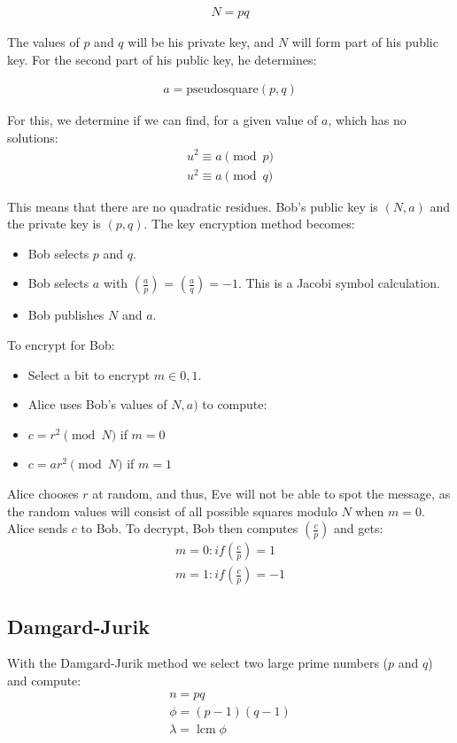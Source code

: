 \documentclass[envcountsame,runningheads,notitlepage]{llncs}
\begin{document}
\begin{align}
N=pq
\end{align}

The values of $p$ and $q$ will be his private key, and $N$ will form part of his public key. For the second part of his public key, he determines:

\begin{align}
a=\textrm{pseudosquare}(p, q)
\end{align}

For this, we determine if we can find, for a given value of $a$, which has no solutions: 
\begin{align}
u^2 \equiv a \pmod p\\
u^2 \equiv a \pmod q
\end{align}

This means that there are no quadratic residues. Bob's public key is $(N,a)$ and the private key is $(p,q)$. The key encryption method becomes:

\begin{itemize}
    \item Bob selects $p$ and $q$.
    \item Bob selects $a$ with $\left(\frac{a}{p}\right) $ = $\left(\frac{a}{q}\right) = -1$. This is a Jacobi symbol calculation.
    \item Bob publishes $N$ and $a$.
\end{itemize}

To encrypt for Bob:

\begin{itemize}
    \item Select a bit to encrypt $m \in {0,1}$.
    \item Alice uses Bob's values of $N,a)$ to compute:
    \item $c = r^2 \pmod N$ if $m=0$
    \item $c = ar^2 \pmod N$ if $m=1$
\end{itemize}

Alice chooses $r$ at random, and thus, Eve will not be able to spot the message, as the random values will consist of all possible squares modulo $N$ when $m=0$. Alice sends $c$ to Bob. To decrypt, Bob then computes $\left( \frac{c}{p}\right)$ and gets:
\begin{align}
m=0: if \left( \frac{c}{p}\right) = 1\\
m=1: if \left( \frac{c}{p}\right)  = -1
\end{align}
\subsection{Damgard-Jurik}
With the Damgard-Jurik method \cite{damgaard2010generalization} we select two large prime numbers ($p$ and $q$) and compute:
\begin{align}
n=pq\\
\phi=(p-1)(q-1)\\
\lambda =\operatorname {lcm} {\phi} 
\end{align}
\end{document}
